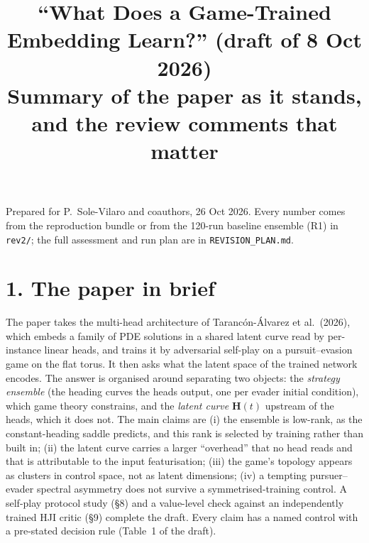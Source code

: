 \documentclass[10pt,a4paper]{article}
\title{\vspace{-1.6cm}\large\textbf{``What Does a Game-Trained Embedding Learn?'' (draft of 8 Oct 2026)}\\
\normalsize Summary of the paper as it stands, and the review comments that matter}
\author{}
\date{}
\begin{document}
\maketitle
\vspace{-2.2cm}
\begin{center}\small\parbox{0.9\textwidth}{\centering Prepared for P.\ Sole-Vilaro and coauthors, 26 Oct 2026. Every number comes from the reproduction bundle or from the 120-run baseline ensemble (R1) in \texttt{rev2/}; the full assessment and run plan are in \texttt{REVISION\_PLAN.md}.}\end{center}

\section*{1. The paper in brief}

The paper takes the multi-head architecture of Taranc\'on-\'Alvarez et al.\ (2026), which embeds a family of PDE solutions in a shared latent curve read by per-instance linear heads, and trains it by adversarial self-play on a pursuit--evasion game on the flat torus. It then asks what the latent space of the trained network encodes. The answer is organised around separating two objects: the \emph{strategy ensemble} (the heading curves the heads output, one per evader initial condition), which game theory constrains, and the \emph{latent curve} $\boldsymbol{H}(t)$ upstream of the heads, which it does not. The main claims are (i) the ensemble is low-rank, as the constant-heading saddle predicts, and this rank is selected by training rather than built in; (ii) the latent curve carries a larger ``overhead'' that no head reads and that is attributable to the input featurisation; (iii) the game's topology appears as clusters in control space, not as latent dimensions; (iv) a tempting pursuer--evader spectral asymmetry does not survive a symmetrised-training control. A self-play protocol study (\S8) and a value-level check against an independently trained HJI critic (\S9) complete the draft. Every claim has a named control with a pre-stated decision rule (Table~1 of the draft).
\end{document}
